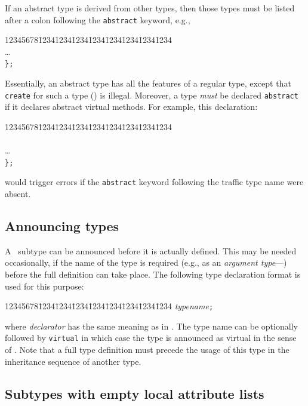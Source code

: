 If an abstract type is derived from other types, then those types must be
listed after a colon following the {\tt abstract} keyword, e.g.,
{\tt\begin{tabbing}
12345678\=1234\=1234\=1234\=1234\=1234\=1234\=1234\=1234\kill
{}\\
\> \>\ldots \\
\> {\tt \};}
\end{tabbing}}

Essentially, an abstract type has all the features of a regular
type, except that {\tt create} for such a type () is illegal.
Moreover, a type {\em must\/} be declared {\tt abstract} if it declares
abstract virtual methods.
For example, this declaration:
{\tt\begin{tabbing}
12345678\=1234\=1234\=1234\=1234\=1234\=1234\=1234\=1234\kill
{}\\
\>  \\
\> \>\ldots \\
\> {\tt \};}
\end{tabbing}}
\noindent
would trigger errors if the {\tt abstract} keyword following the traffic type
name were absent.

\subsection {Announcing types}
\label{rm_st_an}

A \smurph\ subtype can be announced before it is actually defined.
This may be needed occasionally, if the name of the type is required
(e.g.,
as an {\em argument type\/}---) before the full definition
can take place.
The following type declaration format is used for this purpose:
{\tt\begin{tabbing}
12345678\=1234\=1234\=1234\=1234\=1234\=1234\=1234\=1234\kill
{} {\em typename\/}{\tt ;}
\end{tabbing}}
\noindent
where {\em declarator\/} has the same meaning as in .
The type name can be optionally followed by {\tt virtual} in which case
the type is announced as virtual in the sense of .
Note that a full type definition must precede the usage of this type in the
inheritance sequence of another type.

\subsection {Subtypes with empty local attribute lists}
\label{rm_st_ea}

